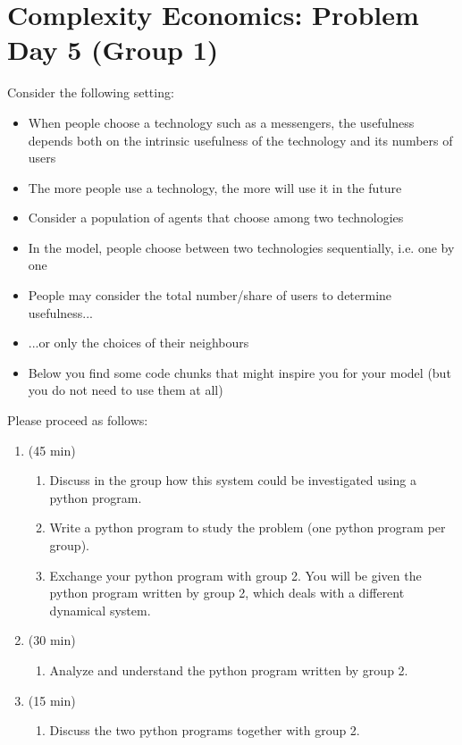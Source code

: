 \documentclass[25pt,a4paper]{article}
\begin{document}
\setlength{\emergencystretch}{0.5cm}
\pagestyle{empty}
\newcommand{\thegroup}{1}
\newcommand{\ifcasewrapper}[1]
{\ifcase#1\relax\or 
    \newcommand{\theothergroup}{2} %
\or 
    \newcommand{\theothergroup}{1} %
\or 
    \newcommand{\theothergroup}{4} %
\or 
    \newcommand{\theothergroup}{3} %
\fi
}
\ifcasewrapper{\thegroup}
\section*{Complexity Economics: Problem Day 5 (Group \thegroup)}

Consider the following setting:
\begin{itemize}
  \item When people choose a technology such as a messengers, the usefulness depends both on the intrinsic usefulness of the technology and its numbers of users
  \item The more people use a technology, the more will use it in the future
  \item Consider a population of agents that choose among two technologies
  \item In the model, people choose between two technologies sequentially, i.e. one by one 
  \item People may consider the total number/share of users to determine usefulness...
  \item ...or only the choices of their neighbours
  \item Below you find some code chunks that might inspire you for your model (but you do not need to use them at all)
\end{itemize}

$$$$
Please proceed as follows:
\begin{enumerate}
\item (45 min)
\begin{enumerate}
\item Discuss in the group how this system could be investigated using a python program.
\item Write a python program to study the problem (one python program per group).
\item Exchange your python program with group \theothergroup. You will be given the python program written by group \theothergroup, which deals with a different dynamical system.
\end{enumerate}
\item (30 min)
\begin{enumerate}
\item Analyze and understand the python program written by group \theothergroup.
\end{enumerate}
\item (15 min)
\begin{enumerate}
\item Discuss the two python programs together with group \theothergroup.
\end{enumerate}
\end{enumerate}
\end{document}
